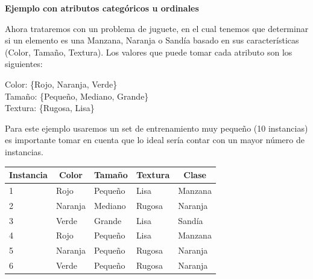 \documentclass[11pt,fleqn]{book} %
\begin{document}
\textbf{Ejemplo con atributos categóricos u ordinales}

Ahora trataremos con un problema de juguete, en el cual tenemos que determinar si un elemento es una Manzana, Naranja o Sandía basado en sus características (Color, Tamaño, Textura).
Los valores que puede tomar cada atributo son los siguientes:

Color: \{Rojo, Naranja, Verde\}\\
Tamaño: \{Pequeño, Mediano, Grande\}\\
Textura: \{Rugosa, Lisa\}

Para este ejemplo usaremos un set de entrenamiento muy pequeño (10 instancias) es importante tomar en cuenta que lo ideal sería contar con un mayor número de instancias.

\FloatBarrier
\begin{table}[ht]
\begin{tabular}{|l|l|l|l|l|}
\hline
\multicolumn{1}{|c|}{\textbf{Instancia}} & \multicolumn{1}{c|}{\textbf{Color}} & \multicolumn{1}{c|}{\textbf{Tamaño}} & \multicolumn{1}{c|}{\textbf{Textura}} & \multicolumn{1}{c|}{\textbf{Clase}} \\ \hline
1                                        & Rojo                                & Pequeño                              & Lisa                                  & Manzana                             \\ \hline
2                                        & Naranja                             & Mediano                              & Rugosa                                & Naranja                             \\ \hline
3                                        & Verde                               & Grande                               & Lisa                                  & Sandía                              \\ \hline
4                                        & Rojo                                & Pequeño                              & Lisa                                  & Manzana                             \\ \hline
5                                        & Naranja                             & Pequeño                              & Rugosa                                & Naranja                             \\ \hline
6                                        & Verde                               & Pequeño                              & Rugosa                                & Naranja                             \\ \hline

\end{tabular}
\end{table}
\end{document}
